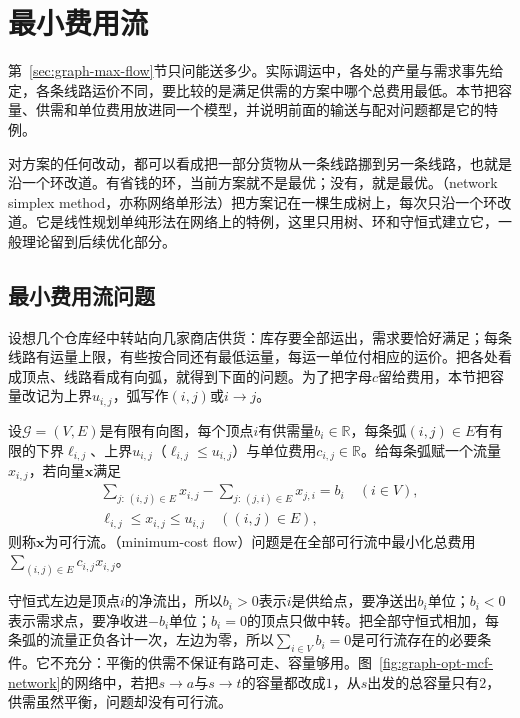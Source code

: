 
\section{最小费用流}
\label{sec:graph-min-cost-flow}

第~\ref{sec:graph-max-flow}节只问能送多少。实际调运中，各处的产量与需求事先给定，各条线路运价不同，要比较的是满足供需的方案中哪个总费用最低。本节把容量、供需和单位费用放进同一个模型，并说明前面的输送与配对问题都是它的特例。

对方案的任何改动，都可以看成把一部分货物从一条线路挪到另一条线路，也就是沿一个环改道。有省钱的环，当前方案就不是最优；没有，就是最优。（network simplex method，亦称网络单形法）把方案记在一棵生成树上，每次只沿一个环改道。它是线性规划单纯形法在网络上的特例，这里只用树、环和守恒式建立它，一般理论留到后续优化部分。

\subsection{最小费用流问题}
\label{sec:graph-opt-mcf-problem}

设想几个仓库经中转站向几家商店供货：库存要全部运出，需求要恰好满足；每条线路有运量上限，有些按合同还有最低运量，每运一单位付相应的运价。把各处看成顶点、线路看成有向弧，就得到下面的问题。为了把字母$c$留给费用，本节把容量改记为上界$u_{i,j}$，弧写作$(i,j)$或$i\to j$。

\begin{definition}[最小费用流问题]
\label{def:graph-opt-min-cost-flow}
设$\mathcal G=(V,E)$是有限有向图，每个顶点$i$有供需量$b_i\in\mathbb R$，每条弧$(i,j)\in E$有有限的下界$\ell_{i,j}$、上界$u_{i,j}$（$\ell_{i,j}\leq u_{i,j}$）与单位费用$c_{i,j}\in\mathbb R$。给每条弧赋一个流量$x_{i,j}$，若向量$\bm x$满足
\begin{equation}
\begin{gathered}
  \sum_{j:\,(i,j)\in E}x_{i,j}-\sum_{j:\,(j,i)\in E}x_{j,i}=b_i\quad(i\in V),\\
  \ell_{i,j}\leq x_{i,j}\leq u_{i,j}\quad((i,j)\in E),
\end{gathered}
  \label{eq:graph-opt-mcf-constraints}
\end{equation}
则称$\bm x$为可行流。（minimum-cost flow）问题是在全部可行流中最小化总费用$\sum_{(i,j)\in E}c_{i,j}x_{i,j}$。
\end{definition}

守恒式左边是顶点$i$的净流出，所以$b_i>0$表示$i$是供给点，要净送出$b_i$单位；$b_i<0$表示需求点，要净收进$-b_i$单位；$b_i=0$的顶点只做中转。把全部守恒式相加，每条弧的流量正负各计一次，左边为零，所以$\sum_{i\in V}b_i=0$是可行流存在的必要条件。它不充分：平衡的供需不保证有路可走、容量够用。图~\ref{fig:graph-opt-mcf-network}的网络中，若把$s\to a$与$s\to t$的容量都改成$1$，从$s$出发的总容量只有$2$，供需虽然平衡，问题却没有可行流。

